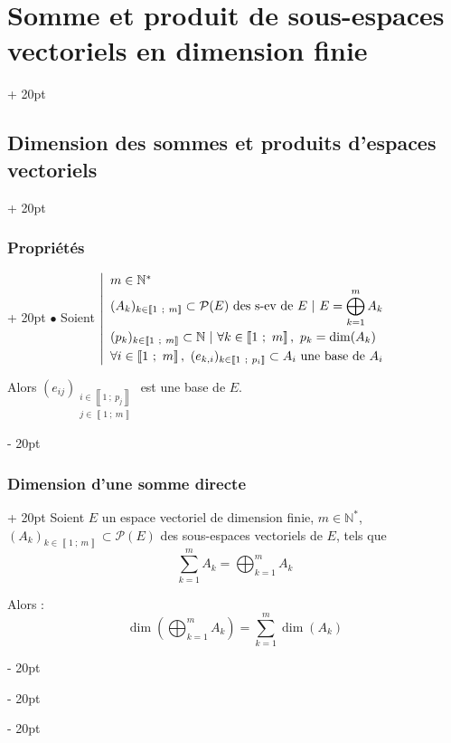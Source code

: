 \documentclass[a4paper, 12pt, twoside]{article}
\newcommand{\N}{\mathbb{N}} %
\newcommand{\nset}[2]{\left\llbracket #1\ ;\ #2 \right\rrbracket}
\newcommand{\lr}[1]{\left( #1 \right)}
\newcommand{\ind}[1][20pt]{\advance\leftskip + #1}
\newcommand{\deind}[1][20pt]{\advance\leftskip - #1}
\newenvironment{indt}[2][20pt]{#2 \par \ind[#1]}{\par \deind} %
\begin{document}
\begin{indt}{\section{Somme et produit de sous-espaces vectoriels en dimension finie}}
\begin{indt}{\subsection{Dimension des sommes et produits d'espaces vectoriels}}
\begin{indt}{\subsubsection{Propriétés}}
                $\bullet$
                Soient
                $
                    \left|
                    \begin{array}{l}
                        m \in \N^*
                        \\
                        (A_k)_{k \in \nset 1 m} \subset \mathcal P(E)\ \text{des s-ev de $E$}\ |\ \displaystyle E = \bigoplus_{k = 1}^m A_k
                        \vspace{3pt}
                        \\
                        (p_k)_{k \in \nset 1 m} \subset \N\ |\ \forall k \in \nset 1 m,\ p_k = \dim(A_k)
                        \vspace{3pt}
                        \\
                        \forall i \in \nset 1 m,\ (e_{k,i})_{k \in \nset{1}{p_i}} \subset A_i\ \text{une base de $A_i$}
                    \end{array}
                    \right.
                $
                
                \vspace{12pt}
                
                Alors $(e_{ij})_{\substack{i \in \nset 1 {p_j} \\ j \in \nset 1 m}}$ est une base de $E$.
            \end{indt}
            
            \vspace{12pt}
            
            \begin{indt}{\subsubsection{Dimension d'une somme directe}}
                Soient $E$ un espace vectoriel de dimension finie, $m \in \N^*$, $(A_k)_{k \in \nset 1 m} \subset \mathcal P(E)$ des sous-espaces vectoriels de $E$, tels que
                    \[ \sum_{k = 1}^m A_k = \bigoplus_{k = 1}^m A_k \]
                
                Alors :
                    \[ \dim\!\lr{\bigoplus_{k = 1}^m A_k} = \sum_{k = 1}^m \dim(A_k) \]
            \end{indt}
            

\end{indt}
\end{indt}
\end{document}

